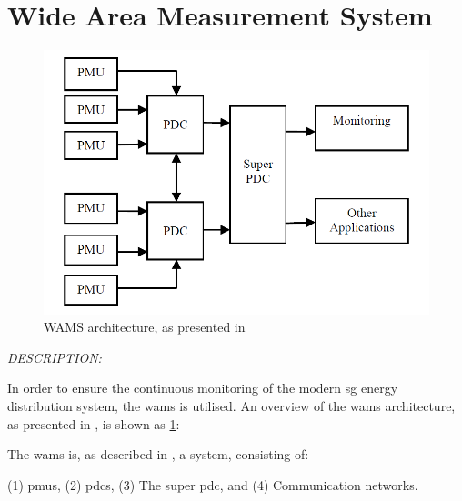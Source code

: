 \section{Wide Area Measurement System}
\begin{figure}[ht]
\includegraphics[width=\linewidth]{figures/Kumar-WAMS-architecture.png}
\caption[WAMS architecture]{WAMS architecture, as presented in \cite{kumar2015monitoring}}
\label{fig:Kumar-WAMS-architecture}
\end{figure}










\textit{DESCRIPTION:}
\textbf{\cite{kumar2015monitoring}  }


    

In order to ensure the continuous monitoring of the modern \acrlong{sg} energy distribution system, the \acrfull{wams} is utilised. An overview of the \acrshort{wams} architecture, as presented in   \cite{kumar2015monitoring}, is shown as \figureautorefname  { } \ref{fig:Kumar-WAMS-architecture}:

The \acrshort{wams} is, as described in  \cite{kumar2015monitoring}, a  system, consisting of:

(1) \acrshort{pmu}s, (2) \acrshort{pdc}s, (3) The super \acrshort{pdc}, and (4) Communication networks.

